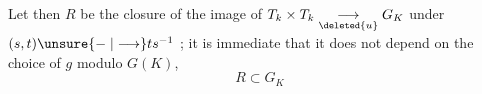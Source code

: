 Let then $R$ \unsure{:} be the closure of the image of $T_k\times T_k\underset{\deleted{u}}{\longrightarrow}G_K$ under $(s,t)\unsure{\mathrel{-}|\longrightarrow}ts^{-1}$ ; it is immediate that it does not depend on the choice of $g$ modulo $G(K)$, 
\[
\boxed{R\subset G_K}
\]
{\centering \textsc{ }\\
\textit{ }\par}
